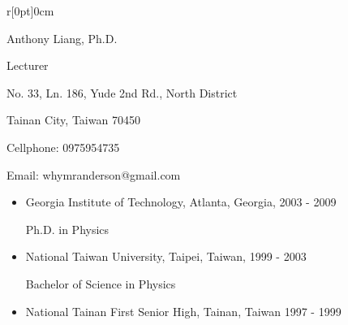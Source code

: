 \documentclass{sebase}
\begin{document}
\begin{wrapfigure}[0]{r}[0pt]{0cm}%

\end{wrapfigure}%

{\huge Anthony Liang, Ph.D.}\vspace*{0.1in}

{\Large Lecturer}\vspace*{0.3in}

{\large No. 33, Ln. 186, Yude 2nd Rd., North District}

{\large Tainan City, Taiwan 70450}

{\large Cellphone: 0975954735}

{\large Email: whymranderson@gmail.com}

\vspace*{0.1in}



\begin{itemize}
\item Georgia Institute of Technology, Atlanta, Georgia, 2003 - 2009

\quad Ph.D. in Physics

\item National Taiwan University, Taipei, Taiwan, 1999 - 2003

\quad Bachelor of Science in Physics

\item National Tainan First Senior High, Tainan, Taiwan 1997 - 1999

\bigskip
\end{itemize}

\end{document}
